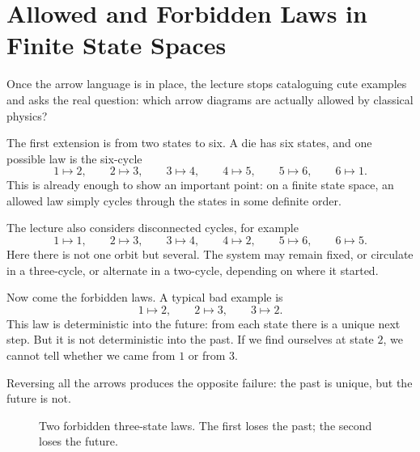 \section{Allowed and Forbidden Laws in Finite State Spaces}

Once the arrow language is in place, the lecture stops cataloguing cute examples and asks the real question: which arrow diagrams are actually allowed by classical physics?

The first extension is from two states to six. A die has six states, and one possible law is the six-cycle
\begin{equation}
1\mapsto2,\qquad
2\mapsto3,\qquad
3\mapsto4,\qquad
4\mapsto5,\qquad
5\mapsto6,\qquad
6\mapsto1.
\end{equation}
This is already enough to show an important point: on a finite state space, an allowed law simply cycles through the states in some definite order.

The lecture also considers disconnected cycles, for example
\begin{equation}
1\mapsto1,\qquad
2\mapsto3,\qquad
3\mapsto4,\qquad
4\mapsto2,\qquad
5\mapsto6,\qquad
6\mapsto5.
\end{equation}
Here there is not one orbit but several. The system may remain fixed, or circulate in a three-cycle, or alternate in a two-cycle, depending on where it started.

Now come the forbidden laws. A typical bad example is
\[
1\mapsto2,\qquad 2\mapsto3,\qquad 3\mapsto2.
\]
This law is deterministic into the future: from each state there is a unique next step. But it is not deterministic into the past. If we find ourselves at state \(2\), we cannot tell whether we came from \(1\) or from \(3\).

Reversing all the arrows produces the opposite failure: the past is unique, but the future is not.

\begin{figure}[htbp]
\centering
{}
\caption{Two forbidden three-state laws. The first loses the past; the second loses the future.}
\end{figure}

